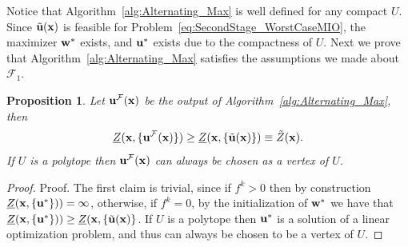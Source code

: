 \documentclass[12pt,x11names]{article}
\newtheorem{proposition}{Proposition} %
\theoremstyle{definition}
\newcommand{\bu}{{\bf u}}
\newcommand{\bw}{{\bf w}}
\newcommand{\bx}{{\bf x}}
\begin{document}
Notice that Algorithm~\ref{alg:Alternating_Max} is well defined for any compact $U$. Since $\tilde{\bu}(\bx)$ is feasible for Problem~\eqref{eq:SecondStage_WorstCaseMIO}, the maximizer $\bw^*$ exists, and $\bu^*$ exists due to the compactness of $U$. Next we prove that Algorithm~\ref{alg:Alternating_Max} satisfies the assumptions we made about $\mathcal{F}_1$.

\begin{proposition}
Let $\bu^{\mathcal{F}}(\bx)$ be the output of Algorithm~\ref{alg:Alternating_Max}, then
$$\underline{Z}(\bx,\{\bu^{\mathcal{F}}(\bx)\})\geq \underline{Z}(\bx,\{\tilde{\bu}(\bx)\})\equiv\tilde{Z}(\bx).$$
If $U$ is a polytope then $\bu^{\mathcal{F}}(\bx)$ can always be chosen as a vertex of $U$.
\end{proposition}
\begin{proof}{Proof.}
The first claim is trivial, since if $f^k>0$ then by construction $\underline{Z}(\bx,\{\bu^*\}))=\infty$, otherwise, if $f^k=0$, by the initialization of
$\bw^*$ we have that $\underline{Z}(\bx,\{\bu^*\}))\geq \underline{Z}(\bx,\{\tilde{\bu}(\bx)\}$.
If $U$ is a polytope then $\bu^*$ is a solution of a linear optimization problem, and thus can always be chosen to be a vertex of $U$. %
\end{proof}
 
\end{document}
